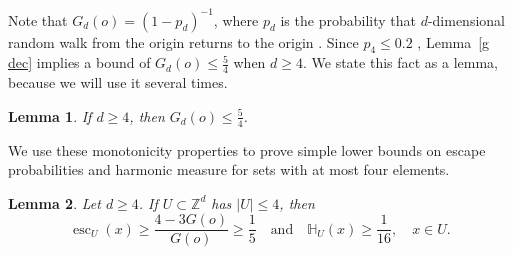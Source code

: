 \documentclass[11pt,reqno]{amsart}
\newtheorem{lemma}{Lemma}[section]
\theoremstyle{definition}
\numberwithin{equation}{section}
\newcommand{\Z}{\mathbb{Z}}
\newcommand{\1}{\mathbf{1}}
\renewcommand{\H}{\mathbb{H}}
\DeclareMathOperator{\Es}{esc}
\begin{document}
Note that $G_d (o) = (1-p_d)^{-1}$, where $p_d$ is the probability that $d$-dimensional random walk from the origin returns to the origin \cite[Equation 3.15]{popov2021}. Since $p_4 \leq 0.2$ \cite{finch2003}, Lemma~\ref{g dec} implies a bound of $G_d (o) \leq \frac54$ when $d \geq 4$. We state this fact as a lemma, because we will use it several times.

\begin{lemma}\label{g5}
If $d \geq 4$, then $G_d (o) \leq \frac54$.
\end{lemma}



We use these monotonicity properties to prove simple lower bounds on escape probabilities and harmonic measure for sets with at most four elements.
\begin{lemma}\label{min es}
Let $d \geq 4$. If $U \subset \Z^d$ has $|U| \leq 4$, then
\begin{equation}\label{eq min es2}
\Es_U (x) \geq \frac{4 - 3 G(o)}{G(o)} \geq \frac15 \quad \text{and} \quad \H_U (x) \geq \frac{1}{16}, \quad x \in U.
\end{equation}
\end{lemma}
\end{document}
